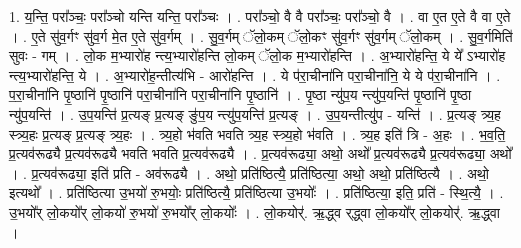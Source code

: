 \documentclass[17pt]{extarticle}
\begin{document}
1. य॒न्ति॒ परा᳚ञ्चः॒ परा᳚ञ्चो यन्ति यन्ति॒ परा᳚ञ्चः । . परा᳚ञ्चो॒ वै वै परा᳚ञ्चः॒ परा᳚ञ्चो॒ वै । . वा ए॒त ए॒ते वै वा ए॒ते । . ए॒ते सु॑व॒र्गꣳ सु॑व॒र्ग मे॒त ए॒ते सु॑व॒र्गम् । . सु॒व॒र्गम् ॅलो॒कम् ॅलो॒कꣳ सु॑व॒र्गꣳ सु॑व॒र्गम् ॅलो॒कम् । . सु॒व॒र्गमिति॑ सुवः - गम् । . लो॒क म॒भ्यारो॑ह न्त्य॒भ्यारो॑हन्ति लो॒कम् ॅलो॒क म॒भ्यारो॑हन्ति । . अ॒भ्यारो॑हन्ति॒ ये ये᳚ ऽभ्यारो॑ह न्त्य॒भ्यारो॑हन्ति॒ ये । . अ॒भ्यारो॑ह॒न्तीत्य॑भि - आरो॑हन्ति । . ये प॑रा॒चीना॑नि परा॒चीना॑नि॒ ये ये प॑रा॒चीना॑नि । . प॒रा॒चीना॑नि पृ॒ष्ठानि॑ पृ॒ष्ठानि॑ परा॒चीना॑नि परा॒चीना॑नि पृ॒ष्ठानि॑ । . पृ॒ष्ठा न्यु॑प॒य न्त्यु॑प॒यन्ति॑ पृ॒ष्ठानि॑ पृ॒ष्ठा न्यु॑प॒यन्ति॑ । . उ॒प॒यन्ति॑ प्र॒त्यङ् प्र॒त्यङ् ङु॑प॒य न्त्यु॑प॒यन्ति॑ प्र॒त्यङ् । . उ॒प॒यन्तीत्यु॑प - यन्ति॑ । . प्र॒त्यङ् त्र्य॒ह स्त्र्य॒हः प्र॒त्यङ् प्र॒त्यङ् त्र्य॒हः । . त्र्य॒हो भ॑वति भवति त्र्य॒ह स्त्र्य॒हो भ॑वति । . त्र्य॒ह इति॑ त्रि - अ॒हः । . भ॒व॒ति॒ प्र॒त्यव॑रूढ्यै प्र॒त्यव॑रूढ्यै भवति भवति प्र॒त्यव॑रूढ्यै । . प्र॒त्यव॑रूढ्या॒ अथो॒ अथो᳚ प्र॒त्यव॑रूढ्यै प्र॒त्यव॑रूढ्या॒ अथो᳚ । . प्र॒त्यव॑रूढ्या॒ इति॑ प्रति - अव॑रूढ्यै । . अथो॒ प्रति॑ष्ठित्यै॒ प्रति॑ष्ठित्या॒ अथो॒ अथो॒ प्रति॑ष्ठित्यै । . अथो॒ इत्यथो᳚ । . प्रति॑ष्ठित्या उ॒भयो॑ रु॒भयोः॒ प्रति॑ष्ठित्यै॒ प्रति॑ष्ठित्या उ॒भयोः᳚ । . प्रति॑ष्ठित्या॒ इति॒ प्रति॑ - स्थि॒त्यै॒ । . उ॒भयो᳚र् लो॒कयो᳚र् लो॒कयो॑ रु॒भयो॑ रु॒भयो᳚र् लो॒कयोः᳚ । . लो॒कयोर्॑. ऋ॒द्ध्व र्‌द्ध्वा लो॒कयो᳚र् लो॒कयोर्॑. ऋ॒द्ध्वा । \newline
\end{document}
